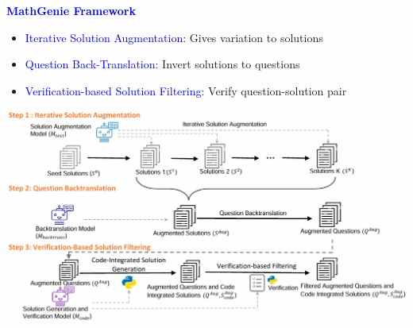 \documentclass[professionalfont]{beamer}
\begin{document}
\begin{frame}
\begin{center}
    { \textbf{\textcolor{blue}{ {\fontsize{12}{14}\selectfont MathGenie Framework} }} }
\end{center}

{\fontsize{10}{14}\selectfont 
\begin{itemize}
    \item {\textcolor{blue}{Iterative Solution Augmentation}}: Gives variation to solutions
\end{itemize}

\begin{itemize}
    \item {\textcolor{blue}{Question Back-Translation}}: Invert solutions to questions
\end{itemize}

\begin{itemize}
    \item {\textcolor{blue}{Verification-based Solution Filtering}}: Verify question-solution pair
\end{itemize}
}

\begin{center}
    \includegraphics[width=1.0\textwidth]{figure1.png}
\end{center}

\end{frame}
\end{document}
